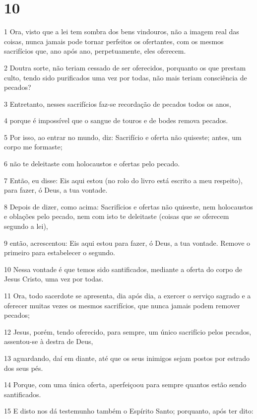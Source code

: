 \chapter{10}

\par 1 Ora, visto que a lei tem sombra dos bens vindouros, não a imagem real das coisas, nunca jamais pode tornar perfeitos os ofertantes, com os mesmos sacrifícios que, ano após ano, perpetuamente, eles oferecem.
\par 2 Doutra sorte, não teriam cessado de ser oferecidos, porquanto os que prestam culto, tendo sido purificados uma vez por todas, não mais teriam consciência de pecados?
\par 3 Entretanto, nesses sacrifícios faz-se recordação de pecados todos os anos,
\par 4 porque é impossível que o sangue de touros e de bodes remova pecados.
\par 5 Por isso, ao entrar no mundo, diz: Sacrifício e oferta não quiseste; antes, um corpo me formaste;
\par 6 não te deleitaste com holocaustos e ofertas pelo pecado.
\par 7 Então, eu disse: Eis aqui estou (no rolo do livro está escrito a meu respeito), para fazer, ó Deus, a tua vontade.
\par 8 Depois de dizer, como acima: Sacrifícios e ofertas não quiseste, nem holocaustos e oblações pelo pecado, nem com isto te deleitaste (coisas que se oferecem segundo a lei),
\par 9 então, acrescentou: Eis aqui estou para fazer, ó Deus, a tua vontade. Remove o primeiro para estabelecer o segundo.
\par 10 Nessa vontade é que temos sido santificados, mediante a oferta do corpo de Jesus Cristo, uma vez por todas.
\par 11 Ora, todo sacerdote se apresenta, dia após dia, a exercer o serviço sagrado e a oferecer muitas vezes os mesmos sacrifícios, que nunca jamais podem remover pecados;
\par 12 Jesus, porém, tendo oferecido, para sempre, um único sacrifício pelos pecados, assentou-se à destra de Deus,
\par 13 aguardando, daí em diante, até que os seus inimigos sejam postos por estrado dos seus pés.
\par 14 Porque, com uma única oferta, aperfeiçoou para sempre quantos estão sendo santificados.
\par 15 E disto nos dá testemunho também o Espírito Santo; porquanto, após ter dito:
